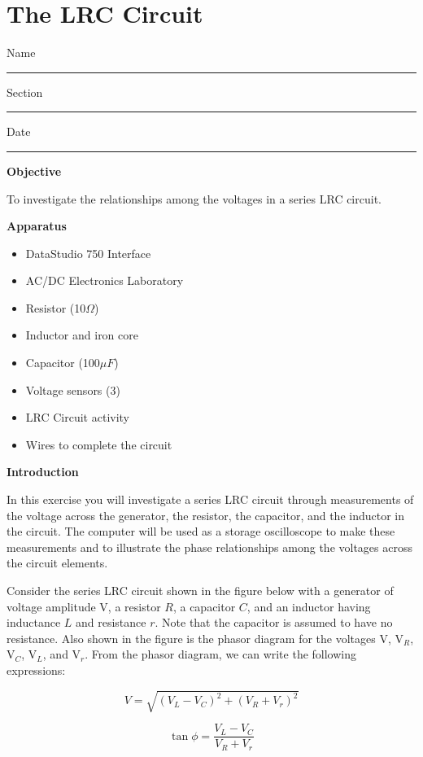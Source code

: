 
\section{The LRC Circuit}

Name \rule{2.0in}{0.1pt}\hfill{}Section \rule{1.0in}{0.1pt}\hfill{}Date
\rule{1.0in}{0.1pt}

\textbf{Objective}

To investigate the relationships among the voltages in a series LRC
circuit.

\textbf{Apparatus} 

\begin{itemize}
\item DataStudio 750 Interface
\item AC/DC Electronics Laboratory
\item Resistor (10$\Omega$)
\item Inductor and iron core 
\item Capacitor (100$\mu F$)
\item Voltage sensors (3)
\item LRC Circuit activity
\item Wires to complete the circuit
\end{itemize}
\textbf{Introduction} 

In this exercise you will investigate a series LRC circuit through
measurements of the voltage across the generator, the resistor, the
capacitor, and the inductor in the circuit. The computer will be used
as a storage oscilloscope to make these measurements and to illustrate
the phase relationships among the voltages across the circuit elements.

Consider the series LRC circuit shown in the figure below with a generator
of voltage amplitude V, a resistor $R$, a capacitor $C$, and an inductor
having inductance $L$ and resistance $r$. Note that the capacitor is assumed
to have no resistance. Also shown in the figure is the phasor diagram
for the voltages V, V\( _{R} \), V\( _{C} \), V\( _{L} \), and
V\( _{r} \). From the phasor diagram, we can write the following
expressions:

\[
V=\sqrt{(V_{L}-V_{C})^{2}+(V_{R}+V_{r})^{2}}\]


\[
\tan \phi =\frac{V_{L}-V_{C}}{V_{R}+V_{r}}\]


\vspace{0.3cm}
{\centering {} \par}
\vspace{0.3cm}

